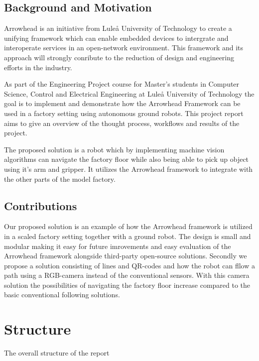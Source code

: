 \subsection{Background and Motivation}
Arrowhead is an initiative from Luleå University of Technology to create a unifying framework which can enable embedded devices to intergrate and interoperate services in an open-network environment. This framework and its approach will strongly conribute to the reduction of design and engineering efforts in the industry. 

As part of the Engineering Project course for Master's students in Computer Science, Control and Electrical Engineering at Luleå University of Technology the goal is to implement and demonstrate how the Arrowhead Framework can be used in a factory setting using autonomous ground robots. This project report aims to give an overview of the thought process, workflows and results of the project.

The proposed solution is a robot which by implementing machine vision algorithms can navigate the factory floor while also being able to pick up object using it's arm and gripper. It utilizes the Arrowhead framework to integrate with the other parts of the model factory. 

\subsection{Contributions}
Our proposed solution is an example of how the Arrowhead framework is utilized in a scaled factory setting together with a ground robot. The design is small and modular making it easy for future imrovements and easy evaluation of the Arrowhead framework alongside third-party open-source solutions. Secondly we propose a solution consisting of lines and QR-codes and how the robot can fllow a path using a RGB-camera instead of the conventional sensors. With this camera solution the possibilities of navigating the factory floor increase compared to the basic conventional following solutions. 
\section*{Structure}
The overall structure of the report
